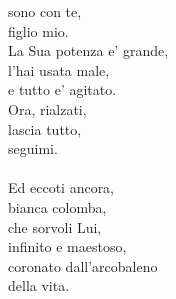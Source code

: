 \begin{haiku}
sono con te,\\
figlio mio.\\
La Sua potenza e' grande,\\
l'hai usata male,\\
e tutto e' agitato.\\
Ora, rialzati,\\
lascia tutto,\\
seguimi.\\
\leavevmode\\
Ed eccoti ancora,\\
bianca colomba,\\
che sorvoli Lui,\\
infinito e maestoso,\\
coronato dall'arcobaleno\\
della vita.\\
\end{haiku}

